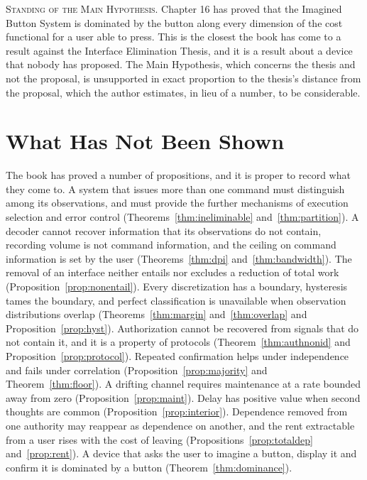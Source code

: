 \documentclass[11pt,twoside,openany]{book}
\theoremstyle{definition}
\theoremstyle{remark}
\newenvironment{standing}{\par\medskip\noindent\hrulefill\par\smallskip\noindent\textsc{Standing of the Main Hypothesis.}\enspace}{\par\smallskip\noindent\hrulefill\par\medskip}
\begin{document}
\begin{standing}
Chapter 16 has proved that the Imagined Button System is dominated by the button along every dimension of the cost functional for a user able to press. This is the closest the book has come to a result against the Interface Elimination Thesis, and it is a result about a device that nobody has proposed. The Main Hypothesis, which concerns the thesis and not the proposal, is unsupported in exact proportion to the thesis's distance from the proposal, which the author estimates, in lieu of a number, to be considerable.
\end{standing}

\chapter{What Has Not Been Shown}

The book has proved a number of propositions, and it is proper to record what they come to. A system that issues more than one command must distinguish among its observations, and must provide the further mechanisms of execution selection and error control (Theorems~\ref{thm:ineliminable} and~\ref{thm:partition}). A decoder cannot recover information that its observations do not contain, recording volume is not command information, and the ceiling on command information is set by the user (Theorems~\ref{thm:dpi} and~\ref{thm:bandwidth}). The removal of an interface neither entails nor excludes a reduction of total work (Proposition~\ref{prop:nonentail}). Every discretization has a boundary, hysteresis tames the boundary, and perfect classification is unavailable when observation distributions overlap (Theorems~\ref{thm:margin} and~\ref{thm:overlap} and Proposition~\ref{prop:hyst}). Authorization cannot be recovered from signals that do not contain it, and it is a property of protocols (Theorem~\ref{thm:authnonid} and Proposition~\ref{prop:protocol}). Repeated confirmation helps under independence and fails under correlation (Proposition~\ref{prop:majority} and Theorem~\ref{thm:floor}). A drifting channel requires maintenance at a rate bounded away from zero (Proposition~\ref{prop:maint}). Delay has positive value when second thoughts are common (Proposition~\ref{prop:interior}). Dependence removed from one authority may reappear as dependence on another, and the rent extractable from a user rises with the cost of leaving (Propositions~\ref{prop:totaldep} and~\ref{prop:rent}). A device that asks the user to imagine a button, display it and confirm it is dominated by a button (Theorem~\ref{thm:dominance}).
\end{document}
